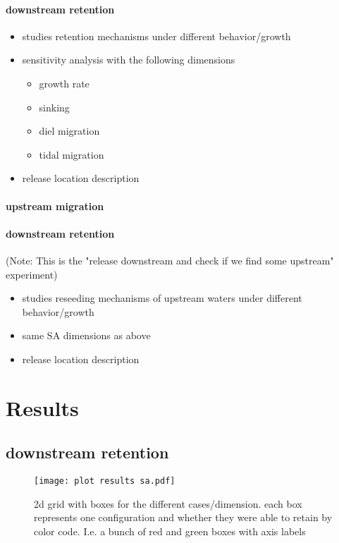 \paragraph{downstream retention}
\begin{itemize}
    \item studies retention mechanisms under different behavior/growth
    \item sensitivity analysis with the following dimensions
    \begin{itemize}
        \item growth rate 
        \item sinking
        \item diel migration
        \item tidal migration
    \end{itemize} 
    \item release location description
\end{itemize}


\paragraph{upstream migration}
\paragraph{downstream retention}

(Note: This is the "release downstream and check if we find some upstream" experiment)
\begin{itemize}
    \item studies reseeding mechanisms of upstream waters under different behavior/growth
    \item same SA dimensions as above
    \item release location description
\end{itemize}

\section*{Results}

\subsection*{downstream retention}

\begin{figure}
    \texttt{[image: plot results sa.pdf]}
    \caption{2d grid with boxes for the different cases/dimension. 
             each box represents one configuration and whether they were able to retain by color code.
             I.e. a bunch of red and green boxes with axis labels}
    \label{fig:retention_results_SA}
\end{figure}


